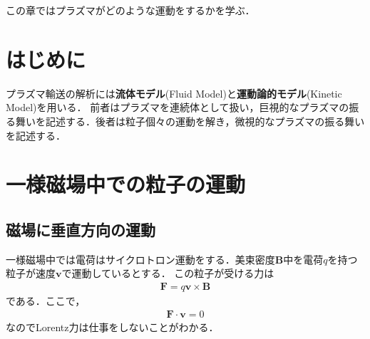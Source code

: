 \documentclass{report}
\begin{document}
  この章ではプラズマがどのような運動をするかを学ぶ．

  \section{はじめに}

    プラズマ輸送の解析には\textbf{流体モデル}(Fluid Model)と\textbf{運動論的モデル}(Kinetic Model)を用いる．
    前者はプラズマを連続体として扱い，巨視的なプラズマの振る舞いを記述する．後者は粒子個々の運動を解き，微視的なプラズマの振る舞いを記述する．
    
  \section{一様磁場中での粒子の運動}
    \subsection{磁場に垂直方向の運動}
      
      一様磁場中では電荷はサイクロトロン運動をする．美束密度$\bm{B}$中を電荷$q$を持つ粒子が速度$\bm{v}$で運動しているとする．
      この粒子が受ける力は
      \begin{align}
        \bm{F} = q\bm{v}\times\bm{B}
      \end{align}
      である．ここで，
      \begin{align}
        \bm{F} \cdot \bm{v} = 0
      \end{align}
      なのでLorentz力は仕事をしないことがわかる．
\end{document}
